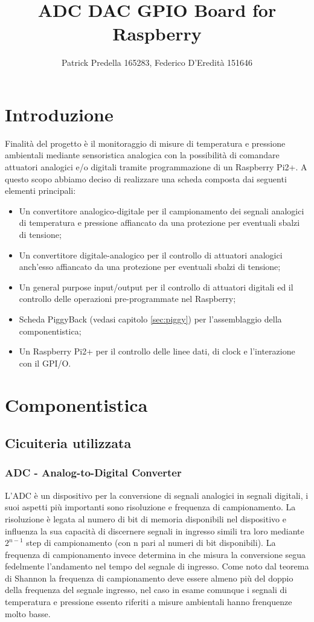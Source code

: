 \documentclass[10pt]{article}
\title{ADC DAC GPIO Board for Raspberry}
\author{Patrick Predella 165283, Federico D'Eredità 151646 }
\date{}
\begin{document}
\maketitle
\tableofcontents

\section{Introduzione}
Finalità del progetto è il monitoraggio di misure di temperatura e pressione ambientali mediante sensoristica analogica con la possibilità di comandare attuatori analogici e/o digitali tramite programmazione di un Raspberry Pi2+.
A questo scopo abbiamo deciso di realizzare una scheda composta dai seguenti elementi principali:
\begin{itemize}
\item Un convertitore analogico-digitale per il campionamento dei segnali analogici di temperatura e pressione affiancato da una protezione per eventuali sbalzi di tensione;
\item Un convertitore digitale-analogico per il controllo di attuatori analogici anch'esso affiancato da una protezione per eventuali sbalzi di tensione;
\item Un general purpose input/output per il controllo di attuatori digitali ed il controllo delle operazioni pre-programmate nel Raspberry;
\item Scheda PiggyBack (vedasi capitolo \ref{sec:piggy}) per l'assemblaggio della componentistica;
\item Un Raspberry Pi2+ per il controllo delle linee dati, di clock e l'interazione con il GPI/O.
\end{itemize}


\section{Componentistica}
	\subsection{Cicuiteria utilizzata}

		\subsubsection{ADC - Analog-to-Digital Converter}\label{sec:adc}
		L'ADC è un dispositivo per la conversione di segnali analogici in segnali digitali, i suoi aspetti più importanti sono risoluzione e frequenza di campionamento.
		La risoluzione è legata al numero di bit di memoria disponibili nel dispositivo e influenza la sua capacità di discernere segnali in ingresso simili tra loro mediante $2^{n-1}$ step di campionamento (con n pari al numeri di bit disponibili). La frequenza di campionamento invece determina in che misura la conversione segua fedelmente l'andamento nel tempo del segnale di ingresso. Come noto dal teorema di Shannon la frequenza di campionamento deve essere almeno più del doppio della frequenza del segnale ingresso, nel caso in esame comunque i segnali di temperatura e pressione essento riferiti a misure ambientali hanno frenquenze molto basse.
\end{document}
